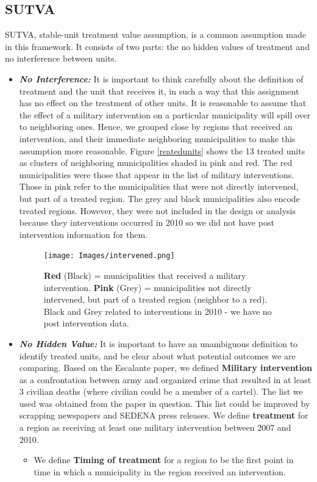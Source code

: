\documentclass{article}[11 pt]
\begin{document}
\subsection{SUTVA}		
		SUTVA, stable-unit treatment value assumption, is a common assumption made in this framework. It consists of two parts: the no hidden values of treatment and no interference between units.
		\begin{itemize}
			\item \emph{\textbf{No Interference:}} It is important to think carefully about the definition of treatment and the unit that receives it, in such a way that this assignment has no effect on the treatment of other units. It is reasonable to assume that the effect of a military intervention on a particular municipality will spill over to neighboring ones. Hence, we grouped close by regions that received an intervention, and their immediate neighboring municipalities to make this assumption more reasonable. Figure \ref{reatedunits} shows the 13 treated units as clusters of neighboring municipalities shaded in pink and red. The red municipalities were those that appear in the list of military interventions. Those in pink refer to the municipalities that were not directly intervened, but part of a treated region. The grey and black municipalities also encode treated regions. However, they were not included in the design or analysis because they interventions occurred in 2010 so we did not have post intervention information for them. 
			\begin{figure}[htdp]
				\centering
			      \texttt{[image: Images/intervened.png]}
			      \caption{\textbf{Red} (Black) = municipalities that received a military intervention. \newline
			\textbf{Pink} (Grey) = municipalities not directly intervened, but part of a treated region (neighbor to a red).\newline
			 \small{Black and Grey related to interventions in 2010 - we have no post intervention data}.}
			\label{treatedUnits}
			\end{figure}
			
			\item \emph{\textbf{No Hidden Value:}} It is important to have an unambiguous definition to identify treated units, and be clear about what potential outcomes we are comparing. Based on the Escalante paper, we defined \textbf{ Military intervention} as a confrontation between army and organized crime that resulted in at least 3 civilian deaths (where civilian could be a member of a cartel). The list we used was obtained from the paper in question. This list could be improved by scrapping newspapers and SEDENA press releases. We define \textbf{treatment} for a region as receiving at least one military intervention between 2007 and 2010.
			\begin{itemize}
				\item We define \textbf{Timing of treatment} for a region to be the first point in time in which a municipality in the region received an intervention.
			\end{itemize}  			
		\end{itemize}
		
\end{document}
